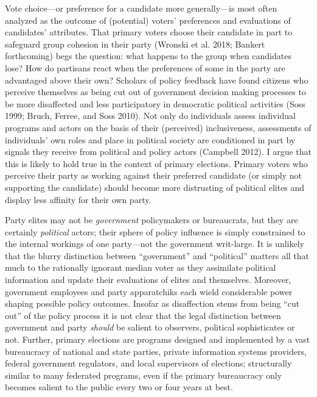 \documentclass[
]{article}
\begin{document}
Vote choice---or preference for a candidate more generally---is most often analyzed as the outcome of (potential) voters' preferences and evaluations of candidates' attributes. That primary voters choose their candidate in part to safeguard group cohesion in their party (Wronski et al. 2018; Bankert forthcoming) begs the question: what happens to the group when candidates lose? How do partisans react when the preferences of some in the party are advantaged above their own? Scholars of policy feedback have found citizens who perceive themselves as being cut out of government decision making processes to be more disaffected and less participatory in democratic political activities (Soss 1999; Bruch, Ferree, and Soss 2010). Not only do individuals assess individual programs and actors on the basis of their (perceived) inclusiveness, assessments of individuals' own roles and place in political society are conditioned in part by signals they receive from political and policy actors (Campbell 2012). I argue that this is likely to hold true in the context of primary elections. Primary voters who perceive their party as working against their preferred candidate (or simply not supporting the candidate) should become more distrusting of political elites and display less affinity for their own party.

Party elites may not be \emph{government} policymakers or bureaucrats, but they are certainly \emph{political} actors; their sphere of policy influence is simply constrained to the internal workings of one party---not the government writ-large. It is unlikely that the blurry distinction between ``government'' and ``political'' matters all that much to the rationally ignorant median voter as they assimilate political information and update their evaluations of elites and themselves. Moreover, government employees and party apparatchiks each wield considerable power shaping possible policy outcomes. Insofar as disaffection stems from being ``cut out'' of the policy process it is not clear that the legal distinction between government and party \emph{should} be salient to observers, political sophisticates or not. Further, primary elections are programs designed and implemented by a vast bureaucracy of national and state parties, private information systems providers, federal government regulators, and local supervisors of elections; structurally similar to many federated programs, even if the primary bureaucracy only becomes salient to the public every two or four years at best.
\end{document}
